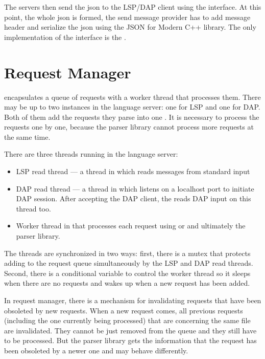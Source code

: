 The servers then send the json to the LSP/DAP client using the  interface. At this point, the whole json is formed, the send message provider has to add message header and serialize the json using the JSON for Modern C++ library. The only implementation of the  interface is the .

\section{Request Manager}

 encapsulates a queue of requests with a worker thread that processes them. There may be up to two  instances in the language server: one for LSP and one for DAP. Both of them add the requests they parse into one . It is necessary to process the requests one by one, because the parser library cannot process more requests at the same time.

There are three threads running in the language server:
\begin{itemize}
	\item LSP read thread --- a thread in which  reads messages from standard input
	\item DAP read thread --- a thread in which  listens on a localhost port to initiate DAP session. After accepting the DAP client, the  reads DAP input on this thread too.
	\item Worker thread in  that processes each request using  or  and ultimately the parser library.
\end{itemize}

The threads are synchronized in two ways: first, there is a mutex that protects adding to the request queue simultaneously by the LSP and DAP read threads. Second, there is a conditional variable to control the worker thread so it sleeps when there are no requests and wakes up when a new request has been added.

In request manager, there is a mechanism for invalidating requests that have been obsoleted by new requests. When a new request comes, all previous requests (including the one currently being processed) that are concerning the same file are invalidated. They cannot be just removed from the queue and they still have to be processed. But the parser library gets the information that the request has been obsoleted by a newer one and may behave differently.

